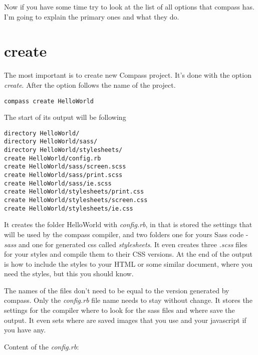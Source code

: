 \documentclass[a4paper,12pt,oneside]{sphinxmanual}
\begin{document}
Now if you have some time try to look at the list of all options that compass has. I'm going to explain the primary ones and what they do.


\section{create}
\label{src/working_with_projects:create}
The most important is to create new Compass project. It's done with the option \emph{create}. After the option follows the name of the project.

\begin{Verbatim}[commandchars=\\\{\}]
compass create HelloWorld
\end{Verbatim}

The start of its output will be following

\begin{Verbatim}[commandchars=\\\{\}]
directory HelloWorld/
directory HelloWorld/sass/
directory HelloWorld/stylesheets/
create HelloWorld/config.rb
create HelloWorld/sass/screen.scss
create HelloWorld/sass/print.scss
create HelloWorld/sass/ie.scss
create HelloWorld/stylesheets/print.css
create HelloWorld/stylesheets/screen.css
create HelloWorld/stylesheets/ie.css
\end{Verbatim}

It creates the folder HelloWorld with \emph{config.rb}, in that is stored the settings that will be used by the compass compiler, and two folders one for yours Sass code - \emph{sass} and one for generated css called \emph{stylesheets}. It even creates three \emph{.scss} files for your styles and compile them to their CSS versions. At the end of the output is how to include the styles to your HTML or some similar document, where you need the styles, but this you should know.

The names of the files don't need to be equal to the version generated by compass. Only the \emph{config.rb} file name needs to stay without change. It stores the settings for the compiler where to look for the sass files and where save the output. It even sets where are saved images that you use and your javascript if you have any.

Content of the \emph{config.rb}:
\end{document}
